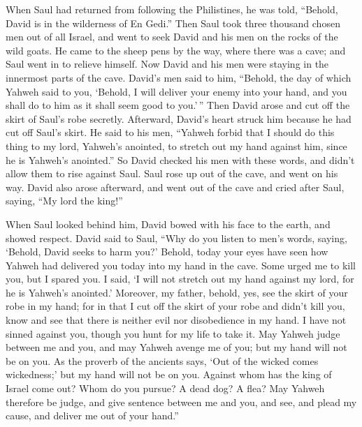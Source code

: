  When Saul had returned from following the Philistines, he
was told, ``Behold, David is in the wilderness of En Gedi.''
 Then Saul took three thousand chosen men out of all Israel,
and went to seek David and his men on the rocks of the wild goats.
 He came to the sheep pens by the way, where there was a
cave; and Saul went in to relieve himself. Now David and his men were
staying in the innermost parts of the cave.  David's men
said to him, ``Behold, the day of which Yahweh said to you, `Behold, I
will deliver your enemy into your hand, and you shall do to him as it
shall seem good to you.'\,'' Then David arose and cut off the skirt of
Saul's robe secretly.  Afterward, David's heart struck him
because he had cut off Saul's skirt.  He said to his men,
``Yahweh forbid that I should do this thing to my lord, Yahweh's
anointed, to stretch out my hand against him, since he is Yahweh's
anointed.''  So David checked his men with these words, and
didn't allow them to rise against Saul. Saul rose up out of the cave,
and went on his way.  David also arose afterward, and went
out of the cave and cried after Saul, saying, ``My lord the king!''

When Saul looked behind him, David bowed with his face to the earth, and
showed respect.  David said to Saul, ``Why do you listen to
men's words, saying, `Behold, David seeks to harm you?' 
Behold, today your eyes have seen how Yahweh had delivered you today
into my hand in the cave. Some urged me to kill you, but I spared you. I
said, `I will not stretch out my hand against my lord, for he is
Yahweh's anointed.'  Moreover, my father, behold, yes, see
the skirt of your robe in my hand; for in that I cut off the skirt of
your robe and didn't kill you, know and see that there is neither evil
nor disobedience in my hand. I have not sinned against you, though you
hunt for my life to take it.  May Yahweh judge between me
and you, and may Yahweh avenge me of you; but my hand will not be on
you.  As the proverb of the ancients says, `Out of the
wicked comes wickedness;' but my hand will not be on you. 
Against whom has the king of Israel come out? Whom do you pursue? A dead
dog? A flea?  May Yahweh therefore be judge, and give
sentence between me and you, and see, and plead my cause, and deliver me
out of your hand.''

